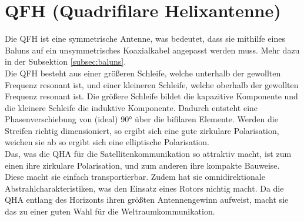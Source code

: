 \section{QFH (Quadrifilare Helixantenne)}
Die QFH ist eine symmetrische Antenne, was bedeutet, dass sie mithilfe eines Baluns auf ein unsymmetrisches Koaxialkabel angepasst werden muss. Mehr dazu in der Subsektion \ref{subsec:baluns}.\\

Die QFH besteht aus einer größeren Schleife, welche unterhalb der gewollten Frequenz resonant ist, und einer kleineren Schleife, welche oberhalb der gewollten Frequenz resonant ist. Die größere Schleife bildet die kapazitive Komponente und die kleinere Schleife die induktive Komponente. Dadurch entsteht eine Phasenverschiebung von (ideal) 90° über die bifilaren Elemente. Werden die Streifen richtig dimensioniert, so ergibt sich eine gute zirkulare Polarisation, weichen sie ab so ergibt sich eine elliptische Polarisation.\\

Das, was die QHA für die Satellitenkommunikation so attraktiv macht, ist zum einen ihre zirkulare Polarisation, und zum anderen ihre kompakte Bauweise. Diese macht sie einfach transportierbar. Zudem hat sie omnidirektionale Abstrahlcharakteristiken, was den Einsatz eines Rotors nichtig macht. Da die QHA entlang des Horizonts ihren größten Antennengewinn aufweist, macht sie das zu einer guten Wahl für die Weltraumkommunikation\cite{qfh_w3kh_nodate}.
